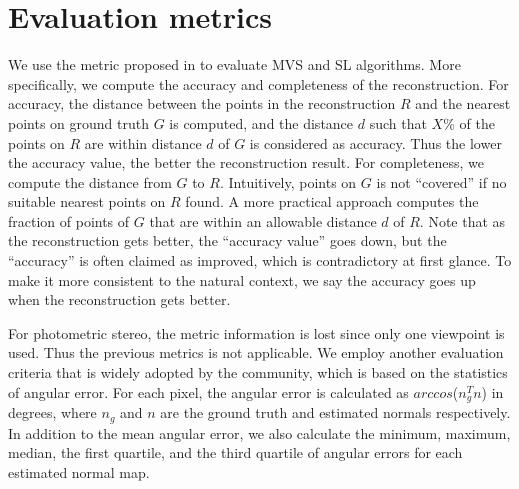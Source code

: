 \section{Evaluation metrics}
We use the metric proposed in \cite{seitz2006comparison} to evaluate MVS and SL algorithms. More specifically, we compute the accuracy and completeness of the reconstruction. For accuracy, the distance between the points in the reconstruction $R$ and the nearest points on ground truth $G$ is computed, and the distance $d$ such that $X\%$ of the points on $R$ are within distance $d$ of $G$ is considered as accuracy. Thus the lower the accuracy value, the better the reconstruction result. For completeness, we compute the distance from $G$ to $R$. Intuitively, points on $G$ is not ``covered'' if no suitable nearest points on $R$ found. A more practical approach computes the fraction of points of $G$ that are within an allowable distance $d$ of $R$.
Note that as the reconstruction gets better, the ``accuracy value'' goes down, but the ``accuracy'' is often claimed as improved, which is contradictory at first glance. To make it more consistent to the natural context, we say the accuracy goes up when the reconstruction gets better.

For photometric stereo, the metric information is lost since only one viewpoint is used. Thus the previous metrics is not applicable. We employ another evaluation criteria that is widely adopted by the community, which is based on the statistics of angular error. For each pixel, the angular error is calculated as $arccos$($n_g^T n$) in degrees, where $n_g$ and $n$ are the ground truth and estimated normals respectively. In addition to the mean angular error, we also calculate the minimum, maximum, median, the first quartile, and the third quartile of angular errors for each estimated normal map.


